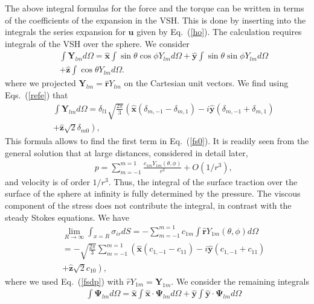 \documentclass[aps,prx,twocolumn,amsmath,amssymb,amsfonts]{revtex4-2}
\begin{document}
{{\begin{appendices}
The above integral formulas for the force and the torque can be written in terms of the coefficients of the expansion in the VSH. This is done by inserting into the integrals the series expansion for $\bm u$ given by Eq.~(\ref{ho}). The calculation requires integrals of the VSH over the sphere. We consider
\begin{eqnarray}&&
\int \bm Y_{lm}d\Omega\!=\!\bm {\hat x}\int \!\!\sin\theta\cos\phi Y_{lm}d\Omega\!+\!\bm {\hat y}\int\!\! \sin\theta\sin\phi Y_{lm}d\Omega
\nonumber\\&&
+\bm {\hat z}\int \cos\theta Y_{lm}d\Omega.
\end{eqnarray}
where we projected $\bm Y_{lm}=\bm {\hat r}Y_{lm}$ on the Cartesian unit vectors. We find using Eqs.~(\ref{refe}) that
\begin{eqnarray}&&
\int \bm Y_{lm}d\Omega\!=\!\delta_{l1}\sqrt{\frac{2\pi}{3}}  \left(\bm {\hat x}(\delta_{m, -1}\!-\!\delta_{m, 1})\!-\! i\bm {\hat y}(\delta_{m, -1}\!+\!\delta_{m, 1})
\right.\nonumber\\&&\left.
+\bm {\hat z}\sqrt{2}\delta_{m0}\right), \label{fsdp}
\end{eqnarray}
This formula allows to find the first term in Eq.~(\ref{fs0}). It is readily seen from the general solution that at large distances, considered in detail later,
\begin{eqnarray}&&\!\!\!\!\!\!\!\!\!\!\!\!\!
p=\sum_{m=-1}^{m=1}\frac{c_{1m}Y_{1m}(\theta, \phi)}{r^{2}}+O(1/r^3),
\end{eqnarray}
and velocity is of order $1/r^3$.  Thus, the integral of the surface traction over the surface of the sphere at infinity is fully determined by the pressure.  The viscous component of the stress does not contribute the integral, in contrast with the steady Stokes equations. We have
\begin{eqnarray}&&
\lim_{R\to\infty}\int_{x=R}  \sigma_{ir}dS=-\sum_{m=-1}^{m=1} c_{1m}\int \bm{\hat r}Y_{1m}(\theta, \phi)d\Omega
\nonumber\\&&=-\sqrt{\frac{2\pi}{3}} \sum_{m=-1}^{m=1} \left(\bm{\hat x}(c_{1, -1}-c_{11})\!-\! i\bm{\hat y}(c_{1, -1}+c_{11})
\right.\nonumber\\&&\left.
+\bm{\hat z}\sqrt{2}c_{10}\right),
\end{eqnarray}
where we used Eq.~(\ref{fsdp}) with ${\hat r}Y_{1m}=\bm Y_{1m}$. We consider the remaining integrals
\begin{eqnarray}&&
\int \!\!\bm \Psi_{lm}d\Omega\!=\!\bm{\hat x}\int \!\!\bm{\hat x}\cdot \bm \Psi_{lm}d\Omega\!+\!\bm{\hat y}\int\!\!\bm{\hat y}\cdot \bm \Psi_{lm}d\Omega

\end{eqnarray}
\end{appendices}}}
\end{document}
